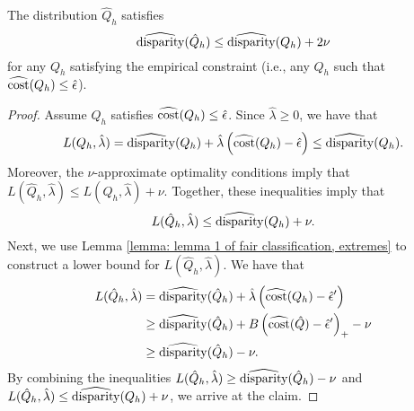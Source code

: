 \documentclass{article}
\begin{document}
\begin{lemma}\label{lemma: lemma 2 of fair classification, extremes}
    The distribution $\hat{Q}_h$ satisfies 
    $$\widehat{\operatorname{disparity}}(\hat{Q}_h) \leq \widehat{\operatorname{disparity}}(Q_h) + 2 \nu$$ 
    for any $Q_h$ satisfying the empirical constraint (i.e., any $Q_h$ such that $\widehat{\operatorname{cost}}(Q_h) \leq \hat{\epsilon}$).
    
    \begin{proof}
        Assume $Q_h$ satisfies $\widehat{\operatorname{cost}}(Q_h) \leq \hat{\epsilon}$. Since $\hat{\lambda} \geq 0$, we have that 
            \[
                L(Q_h, \hat \lambda) = \widehat{\operatorname{disparity}}(Q_h) + \hat{\lambda} \left( \widehat{\operatorname{cost}}(Q_h) - \hat{\epsilon} \right) \leq \widehat{\operatorname{disparity}}(Q_h).
            \]
        Moreover, the $\nu$-approximate optimality conditions imply that $L(\hat{Q}_h, \hat{\lambda}) \leq L(Q_h, \hat{\lambda}) + \nu$. Together, these inequalities imply that 
            \[
                L(\hat{Q}_h, \hat{\lambda}) \leq \widehat{\operatorname{disparity}}(Q_h) + \nu.
            \]
        Next, we use Lemma \ref{lemma: lemma 1 of fair classification, extremes} to construct a lower bound for $L(\hat{Q}_h, \hat{\lambda})$. We have that 
            \begin{align*}
                L(\hat{Q}_h, \hat{\lambda}) &= \widehat{\operatorname{disparity}}(\hat{Q}_h) + \hat{\lambda} \left( \widehat{\operatorname{cost}}(Q_h) - \hat{\epsilon}^\prime \right) \\
                &\geq \widehat{\operatorname{disparity}}(\hat{Q}_h) + B \left( \widehat{\operatorname{cost}}(\hat{Q}) - \hat{\epsilon}^\prime \right)_{+} - \nu \\
                &\geq \widehat{\operatorname{disparity}}(\hat{Q}_h) - \nu.
            \end{align*}
        By combining the inequalities $L(\hat{Q}_h, \hat{\lambda}) \geq \widehat{\operatorname{disparity}}(\hat{Q}_h) - \nu$ and $L(\hat{Q}_h, \hat{\lambda}) \leq \widehat{\operatorname{disparity}}(Q_h) + \nu$, we arrive at the claim.
    \end{proof}
\end{lemma}
\end{document}
